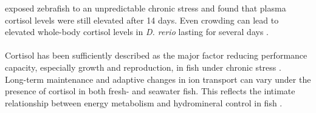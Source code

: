 \documentclass[twoside]{article}
\begin{document}
\begin{multicols}{2}
\cite{piato2011} exposed zebrafish to an unpredictable chronic stress and found that plasma cortisol levels were still elevated after 14 days. Even crowding can lead to elevated whole-body cortisol levels in \textit{D. rerio} lasting for several days \citep{ramsay2006}. \\  \\
Cortisol has been sufficiently described as the major factor reducing performance capacity, especially growth and reproduction, in fish under chronic stress \citep{bonga1997,pickering1981,Schreck2001}. \\ Long-term maintenance and adaptive changes in ion transport can vary under the presence of cortisol in both fresh- and seawater fish. This reflects the intimate relationship between energy metabolism and hydromineral control in fish \citep{bonga1997}. \\


\end{multicols}
\end{document}
